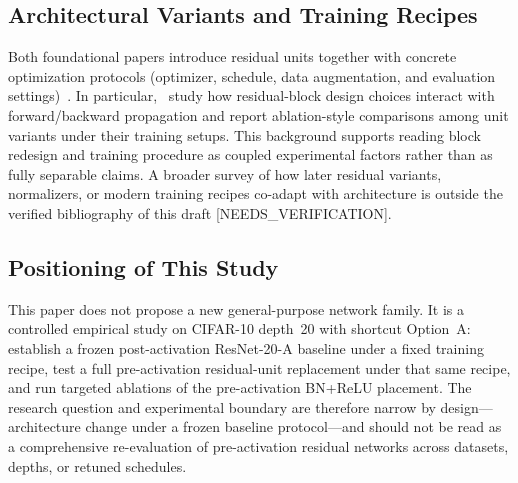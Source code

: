\subsection{Architectural Variants and Training Recipes}
\label{sec:rw-recipes}

Both foundational papers introduce residual units together with concrete optimization
protocols (optimizer, schedule, data augmentation, and evaluation
settings)~\citep{He2016DeepResidual,He2016IdentityMappings}.
In particular,~\citet{He2016IdentityMappings} study how residual-block design choices
interact with forward/backward propagation and report ablation-style comparisons among unit
variants under their training setups.
This background supports reading block redesign and training procedure as coupled
experimental factors rather than as fully separable claims.
A broader survey of how later residual variants, normalizers, or modern training recipes
co-adapt with architecture is outside the verified bibliography of this draft
{[NEEDS\_VERIFICATION]}.

\subsection{Positioning of This Study}
\label{sec:rw-position}

This paper does not propose a new general-purpose network family.
It is a controlled empirical study on CIFAR-10 depth~20 with shortcut Option~A:
establish a frozen post-activation ResNet-20-A baseline under a fixed training recipe,
test a full pre-activation residual-unit replacement under that same recipe, and run
targeted ablations of the pre-activation BN+ReLU placement.
The research question and experimental boundary are therefore narrow by design---architecture
change under a frozen baseline protocol---and should not be read as a comprehensive
re-evaluation of pre-activation residual networks across datasets, depths, or retuned
schedules.
